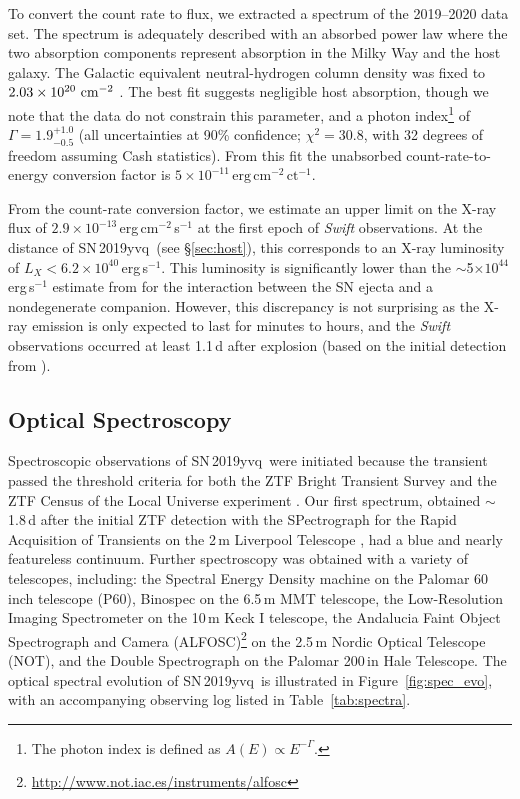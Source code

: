 \documentclass[twocolumn]{aastex63}
\newcommand{\sn}{SN\,2019yvq}
\begin{document}
To convert the count rate to flux, we extracted a spectrum of the 2019--2020
data set. The spectrum is adequately described with an absorbed power law
where the two absorption components represent absorption in the Milky Way and
the host galaxy. The Galactic equivalent neutral-hydrogen column density was
fixed to $2.03\times10^{20}~{\rm cm}^{-2}$ \citep{HI4PI2016a}. The best fit
suggests negligible host absorption, though we note that the data do not
constrain this parameter, and a photon index\footnote{The photon index is
defined as $A(E) \propto E^{-\Gamma}$.} of $\Gamma = 1.9^{+1.0}_{-0.5}$ (all
uncertainties at 90\% confidence; $\chi^2=30.8$, with 32 degrees of freedom
assuming Cash statistics). From this fit the unabsorbed count-rate-to-energy
conversion factor is
$5\times10^{-11}\,\mathrm{erg\,cm}^{-2}\,\mathrm{ct}^{-1}$.

From the count-rate conversion factor, we estimate an upper limit on the X-ray
flux of $2.9 \times 10^{-13}$\,erg\,cm$^{-2}$\,s$^{-1}$ at the first epoch of
\textit{Swift} observations. At the distance of \sn\ (see \S\ref{sec:host}),
this corresponds to an X-ray luminosity of $L_X < 6.2 \times
10^{40}$\,erg\,s$^{-1}$. This luminosity is significantly lower than the
$\sim$5$\times 10^{44}$\,erg\,s$^{-1}$ estimate from \citet{Kasen10a} for the
interaction between the SN ejecta and a nondegenerate companion. However, this
discrepancy is not surprising as the X-ray emission is only expected to last
for minutes to hours, and the \textit{Swift} observations occurred at least
1.1\,d after explosion (based on the initial detection from
\citealt{Itagaki19}).

\subsection{Optical Spectroscopy}



Spectroscopic observations of \sn\ were initiated because the transient passed
the threshold criteria for both the ZTF Bright Transient Survey
\citep{Fremling20} and the ZTF Census of the Local Universe experiment
\citep{De20}. Our first spectrum, obtained $\sim$1.8\,d after the initial ZTF
detection with the SPectrograph for the Rapid Acquisition of Transients
\citep[SPRAT;][]{Piascik14} on the 2\,m Liverpool Telescope
\citep[LT;][]{Steele04}, had a blue and nearly featureless continuum. Further
spectroscopy was obtained with a variety of telescopes, including: the
Spectral Energy Density machine \citep[SEDM;][]{Blagorodnova18,Rigault19} on
the Palomar 60 inch telescope (P60), Binospec \citep{Fabricant19} on the
6.5\,m MMT telescope, the Low-Resolution Imaging Spectrometer
\citep[LRIS;][]{Oke95} on the 10\,m Keck I telescope, the Andalucia Faint
Object Spectrograph and Camera
(ALFOSC)\footnote{\href{http://www.not.iac.es/instruments/alfosc}
{\url{http://www.not.iac.es/instruments/alfosc}}} on the 2.5\,m Nordic Optical
Telescope (NOT), and the Double Spectrograph \citep[DBSP;][]{Oke82} on the
Palomar 200\,in Hale Telescope. The optical spectral evolution of \sn\ is
illustrated in Figure~\ref{fig:spec_evo}, with an accompanying observing log
listed in Table~\ref{tab:spectra}.
\end{document}
